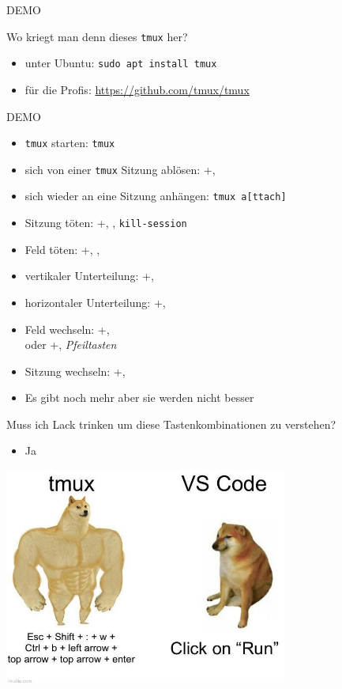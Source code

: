 \documentclass[plain]{beamer}
\newcommand{\prefix}{\Ctrl+\keystroke{b}}
\newcommand{\tmux}{\texttt{tmux}}
\newcommand{\demoslide}{\begin{frame}
  \center \huge DEMO
\end{frame}}
\begin{document}
\demoslide{}

\begin{frame}
  Wo kriegt man denn dieses \tmux{} her?
  \begin{itemize}
    \item unter Ubuntu: \texttt{sudo apt install tmux}
    \item für die Profis: \url{https://github.com/tmux/tmux}
  \end{itemize}
\end{frame}

\demoslide

\begin{frame}
  \begin{itemize}
    \item \tmux{} starten: \texttt{tmux}
    \item sich von einer \tmux{} Sitzung ablösen: \prefix, 
    \item sich wieder an eine Sitzung anhängen: \texttt{tmux a[ttach]}
    \item Sitzung töten: \prefix, \keystroke{:}, \texttt{kill-session}
    \item Feld töten: \prefix, , 
    \item vertikaler Unterteilung: \prefix, \keystroke{\%}
    \item horizontaler Unterteilung: \prefix, 
    \item Feld wechseln: \prefix,  \\ oder \prefix, \textit{Pfeiltasten}
    \item Sitzung wechseln: \prefix, 
    \item Es gibt noch mehr aber sie werden nicht besser
  \end{itemize}
\end{frame}

\begin{frame}
  Muss ich Lack trinken um diese Tastenkombinationen zu verstehen?
  \begin{itemize}
    \item Ja
  \end{itemize}
  \center\includegraphics[width=0.7\textwidth]{imgs/keybinds_meme.jpg}
\end{frame}
\end{document}
